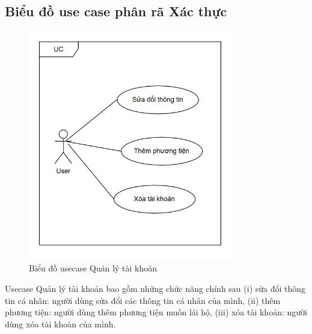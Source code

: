 \documentclass[../DoAn.tex]{subfiles}
\begin{document}
\subsection{Biểu đồ use case phân rã Xác thực}
\label{subsection:2.2.3}
\begin{figure}[H]
  \centering
  \includegraphics[width=0.8\textwidth]{Hinhve/Usecase_quan_ly_tai_khoan.png}
  \caption{Biểu đồ usecase Quản lý tài khoản}
  \label{fig:use_case_quan_ly_tai_khoan}
\end{figure}
Usecase Quản lý tài khoản bao gồm những chức năng chính sau (i) sửa đổi thông tin cá nhân: người dùng sửa đổi các thông tin cá nhân của mình, (ii) thêm phương tiện: người dùng thêm phương tiện muốn lái hộ, (iii) xóa tài khoản: người dùng xóa tài khoản của mình.
\end{document}
